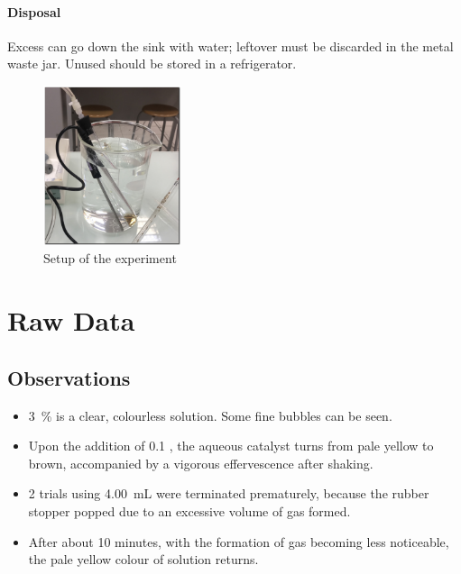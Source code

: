 \documentclass[a4paper, 12pt]{article}
\begin{document}
\paragraph{Disposal} Excess  can go down the sink with water; leftover  must be discarded in the metal waste jar. Unused  should be stored in a refrigerator.

\begin{figure}[H]
    \centering
    \includegraphics[width=0.36\textwidth]{imgs/setup}
    \caption{Setup of the experiment}
    \label{fig:setup}
\end{figure}


\section*{Raw Data}
\subsection*{Observations}
\begin{itemize}
    \itemsep 0em
    \item \SI{3}{\percent}  is a clear, colourless solution. Some fine bubbles can be seen.
    \item Upon the addition of \SI{0.1}{\molar} , the aqueous catalyst turns from pale yellow to brown, accompanied by a vigorous effervescence after shaking.
    \item 2 trials using \SI{4.00}{\mL}  were terminated prematurely, because the rubber stopper popped due to an excessive volume of gas formed.
    \item After about 10 minutes, with the formation of gas becoming less noticeable, the pale yellow colour of  solution returns.
\end{itemize}
\end{document}
